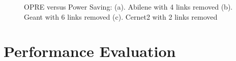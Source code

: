 \documentclass[conference]{IEEEtran}
\begin{document}
\begin{figure}[!t]
\centering
\vspace*{0.1in}
\caption{OPRE versus Power Saving: (a). Abilene with 4 links removed (b). Geant with 6 links removed (c). Cernet2 with 2 links removed}
\label{figure_exp2_sort}
\vspace*{0.1in}
\end{figure}


\section{Performance Evaluation}
\label{performance_evaluation}
\end{document}
